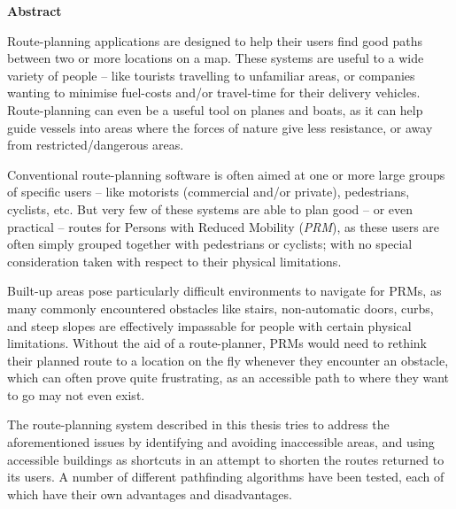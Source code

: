 \thispagestyle{empty}

\begin{center}
    {\LARGE\bf Abstract}
\end{center}





 Route-planning applications are designed to help their users find good paths between two or more locations on a map. These systems are useful to a wide variety of people -- like tourists travelling to unfamiliar areas, or companies wanting to minimise fuel-costs and/or travel-time for their delivery vehicles. Route-planning can even be a useful tool on planes and boats, as it can help guide vessels into areas where the forces of nature give less resistance, or away from restricted/dangerous areas.

Conventional route-planning software is often aimed at one or more large groups of specific users -- like motorists (commercial and/or private), pedestrians, cyclists, etc. But very few of these systems are able to plan good -- or even practical -- routes for Persons with Reduced Mobility (\textit{PRM}), as these users are often simply grouped together with pedestrians or cyclists; with no special consideration taken with respect to their physical limitations.

Built-up areas pose particularly difficult environments to navigate for PRMs, as many commonly encountered obstacles like stairs, non-automatic doors, curbs, and steep slopes are effectively impassable for people with certain physical limitations. Without the aid of a route-planner, PRMs would need to rethink their planned route to a location on the fly whenever they encounter an obstacle, which can often prove quite frustrating, as an accessible path to where they want to go may not even exist.

The route-planning system described in this thesis tries to address the aforementioned issues by identifying and avoiding inaccessible areas, and using accessible buildings as shortcuts in an attempt to shorten the routes returned to its users. A number of different pathfinding algorithms have been tested, each of which have their own advantages and disadvantages.
